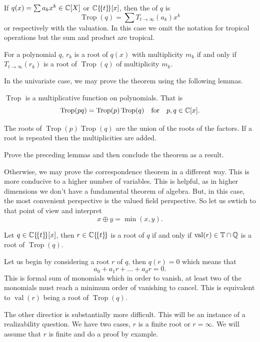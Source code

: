 \documentclass[12pt]{memoir}
\DeclareMathOperator{\val}{val}
\DeclareMathOperator{\Trop}{Trop}
\begin{document}
\begin{Def}
    If $q(x)=\sum a_kx^k\in\mathbb{C}[X]$ or $\mathbb{C}\{\!\{t\}\!\}[x]$, then the  of $q$ is 
    $$\Trop(q)=\sum T_{t\to\infty}(a_k)x^k$$
    or respectively with the valuation. In this case we omit the notation for tropical operations but the sum and product are tropical.
\end{Def}

\begin{Th}
For a polynomial $q$, $r_k$ is a root of $q(x)$ with multiplicity $m_k$ if and only if $T_{t\to\infty}(r_k)$ is a root of $\Trop(q)$ of multiplicity $m_k$.
\end{Th}

In the univariate case, we may prove the theorem using the following lemmas.

\begin{Lem}
$\Trop$ is a multiplicative function on polynomials. That is
$$\Trop(pq)=\Trop(p)\Trop(q)\word{for}p,q\in\bC[x].$$
\end{Lem}

\begin{Lem}
The roots of $\Trop(p)\Trop(q)$ are the union of the roots of the factors. If a root is repeated then the multiplicities are added.
\end{Lem}

\begin{Ej}[2]
Prove the preceding lemmas and then conclude the theorem as a result.
\end{Ej}

Otherwise, we may prove the correspondence theorem in a different way. This is more conducive to a higher number of variables. This is helpful, as in higher dimensions we don't have a fundamental theorem of algebra. But, in this case, the most convenient perspective is the valued field perspective. So let us swtich to that point of view and interpret 
$$x\oplus y=\min(x,y).$$

\begin{Th}
Let $q\in\mathbb{C}\{\!\{t\}\!\}[x]$, then $r\in\mathbb{C}\{\!\{t\}\!\}$ is a root of $q$ if and only if $\val(r)\in\bT\cap\bQ$ is a root of $\Trop(q)$.
\end{Th}

\begin{ptcbp}
Let us begin by considering a root $r$ of $q$, then $q(r)=0$ which means that 
$$a_0+a_1r+\dots+a_dr=0.$$
This is formal sum of monomials which in order to vanish, at least two of the monomials must reach a minimum order of vanishing to cancel. This is equivalent to $\val(r)$ being a root of $\Trop(q)$. \par %
The other directior is substantially more difficult. This will be an instance of a realizability question. We have two cases, $r$ is a finite root or $r=\infty$. We will assume that $r$ is finite and do a proof by example. 
\end{ptcbp}
\end{document}
